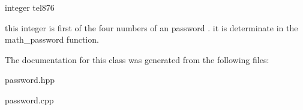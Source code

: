 integer tel876 

this integer is first of the four numbers of an password . it is determinate in the math\+\_\+password function. 

The documentation for this class was generated from the following files\+:\begin{DoxyCompactItemize}
\item 
password.\+hpp\item 
password.\+cpp\end{DoxyCompactItemize}
